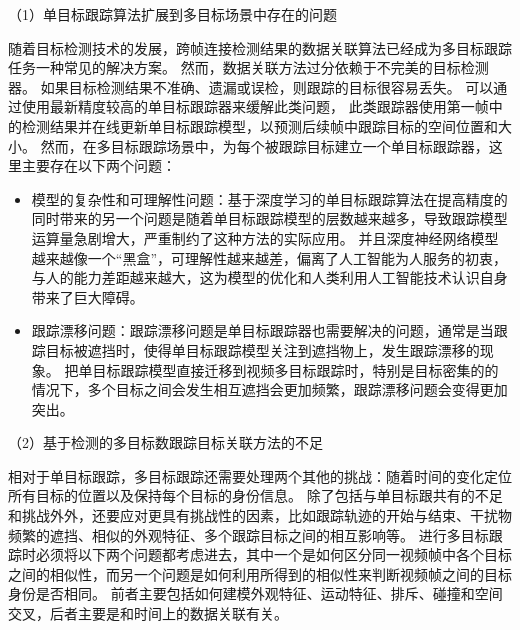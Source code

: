 （1）单目标跟踪算法扩展到多目标场景中存在的问题

随着目标检测技术的发展，跨帧连接检测结果的数据关联算法已经成为多目标跟踪任务一种常见的解决方案。
然而，数据关联方法过分依赖于不完美的目标检测器。
如果目标检测结果不准确、遗漏或误检，则跟踪的目标很容易丢失。
可以通过使用最新精度较高的单目标跟踪器来缓解此类问题，
此类跟踪器使用第一帧中的检测结果并在线更新单目标跟踪模型，以预测后续帧中跟踪目标的空间位置和大小。
然而，在多目标跟踪场景中，为每个被跟踪目标建立一个单目标跟踪器，这里主要存在以下两个问题：
\begin{itemize}
	
	\item 模型的复杂性和可理解性问题：基于深度学习的单目标跟踪算法在提高精度的同时带来的另一个问题是随着单目标跟踪模型的层数越来越多，导致跟踪模型运算量急剧增大，严重制约了这种方法的实际应用。
	并且深度神经网络模型越来越像一个“黑盒”，可理解性越来越差，偏离了人工智能为人服务的初衷，与人的能力差距越来越大，这为模型的优化和人类利用人工智能技术认识自身带来了巨大障碍。
	
	
	\item 跟踪漂移问题：跟踪漂移问题是单目标跟踪器也需要解决的问题，通常是当跟踪目标被遮挡时，使得单目标跟踪模型关注到遮挡物上，发生跟踪漂移的现象。
	把单目标跟踪模型直接迁移到视频多目标跟踪时，特别是目标密集的的情况下，多个目标之间会发生相互遮挡会更加频繁，跟踪漂移问题会变得更加突出。
	
\end{itemize}


（2）基于检测的多目标数跟踪目标关联方法的不足

相对于单目标跟踪，多目标跟踪还需要处理两个其他的挑战：随着时间的变化定位所有目标的位置以及保持每个目标的身份信息。
除了包括与单目标跟共有的不足和挑战外外，还要应对更具有挑战性的因素，比如跟踪轨迹的开始与结束、干扰物频繁的遮挡、相似的外观特征、多个跟踪目标之间的相互影响等。
进行多目标跟踪时必须将以下两个问题都考虑进去，其中一个是如何区分同一视频帧中各个目标之间的相似性，而另一个问题是如何利用所得到的相似性来判断视频帧之间的目标身份是否相同。
前者主要包括如何建模外观特征、运动特征、排斥、碰撞和空间交叉，后者主要是和时间上的数据关联有关。

